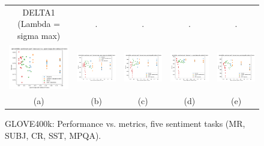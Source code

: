 \begin{figure}
\begin{tabular}{@{\hskip -0.0in}c@{\hskip -0.0in}c@{\hskip -0.0in}c@{\hskip -0.0in}c@{\hskip -0.0in}c@{\hskip -0.0in}}
		DELTA1 (Lambda = sigma max) & . & . & . & .\\
		\includegraphics[width=.2\linewidth]{figures/glove400k_sentiment_mr_test-acc_vs_gram-large-dim-delta1-6-trans_linx.pdf} &
		\includegraphics[width=.2\linewidth]{figures/glove400k_sentiment_subj_test-acc_vs_gram-large-dim-delta1-6-trans_linx.pdf} &
		\includegraphics[width=.2\linewidth]{figures/glove400k_sentiment_cr_test-acc_vs_gram-large-dim-delta1-6-trans_linx.pdf} &
		\includegraphics[width=.2\linewidth]{figures/glove400k_sentiment_sst_test-acc_vs_gram-large-dim-delta1-6-trans_linx.pdf} &
		\includegraphics[width=.2\linewidth]{figures/glove400k_sentiment_mpqa_test-acc_vs_gram-large-dim-delta1-6-trans_linx.pdf} \\	
		\;\;\;\;\;(a) & \;\;\;\;\;\;(b) & \;\;\;\;\;\;(c) & \;\;\;\;\;\;(d) & \;\;\;\;\;\;(e)
	\end{tabular}
	\caption{GLOVE400k: Performance vs. metrics, five sentiment tasks (MR, SUBJ, CR, SST, MPQA).
	}
	\label{fig:glove400k_sent_comparison_results}
\end{figure}



